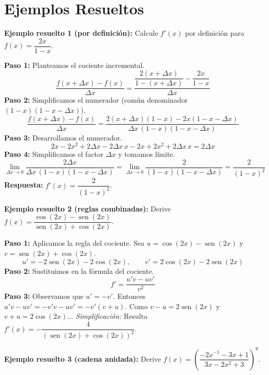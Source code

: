 \documentclass[12pt, letterpaper]{article}
\begin{document}
\newpage
\section{Ejemplos Resueltos}

\noindent\textbf{Ejemplo resuelto 1 (por definición):} Calcule $f'(x)$ por definición para $f(x) = \dfrac{2x}{1-x}$.

\begin{cuadrosolucion}
  \textbf{Paso 1:} Planteamos el cociente incremental.
  \[
    \frac{f(x+\Delta x) - f(x)}{\Delta x}
    = \frac{\dfrac{2(x+\Delta x)}{1-(x+\Delta x)} - \dfrac{2x}{1-x}}{\Delta x}
  \]
  \textbf{Paso 2:} Simplificamos el numerador (común denominador $(1-x)(1-x-\Delta x)$).
  \[
    \frac{f(x+\Delta x) - f(x)}{\Delta x}
    = \frac{2(x+\Delta x)(1-x) - 2x(1-x-\Delta x)}{\Delta x\,(1-x)(1-x-\Delta x)}
  \]
  \textbf{Paso 3:} Desarrollamos el numerador.
  \[
    2x - 2x^2 + 2\Delta x - 2\Delta x\,x - 2x + 2x^2 + 2\Delta x\,x = 2\Delta x
  \]
  \textbf{Paso 4:} Simplificamos el factor $\Delta x$ y tomamos límite.
  \[
    \lim_{\Delta x\to0} \frac{2\Delta x}{\Delta x\,(1-x)(1-x-\Delta x)} = \lim_{\Delta x\to0} \frac{2}{(1-x)(1-x-\Delta x)} = \frac{2}{(1-x)^2}
  \]
  \textbf{Respuesta:} $f'(x) = \dfrac{2}{(1-x)^2}$.
\end{cuadrosolucion}

\noindent\textbf{Ejemplo resuelto 2 (reglas combinadas):} Derive $f(x) = \dfrac{\cos(2x)-\operatorname{sen}(2x)}{\operatorname{sen}(2x)+\cos(2x)}$.

\begin{cuadrosolucion}
  \textbf{Paso 1:} Aplicamos la regla del cociente. Sea $u = \cos(2x)-\operatorname{sen}(2x)$ y $v = \operatorname{sen}(2x)+\cos(2x)$.
  \[
    u' = -2\operatorname{sen}(2x) - 2\cos(2x), \qquad
    v' = 2\cos(2x) - 2\operatorname{sen}(2x)
  \]
  \textbf{Paso 2:} Sustituimos en la fórmula del cociente.
  \[
    f' = \frac{u'v - uv'}{v^2}
  \]
  \textbf{Paso 3:} Observamos que $u' = -v'$. Entonces $u'v - uv' = -v'v - uv' = -v'(v+u)$. Como $v - u = 2\operatorname{sen}(2x)$ y $v + u = 2\cos(2x)$...
  \noindent\textit{Simplificación:} Resulta $f'(x) = -\dfrac{4}{( \operatorname{sen}(2x)+\cos(2x) )^2}$.
\end{cuadrosolucion}

\noindent\textbf{Ejemplo resuelto 3 (cadena anidada):} Derive $f(x) = \left(\dfrac{-2x^{-1} - 3x + 1}{3x - 2x^2 + 3}\right)^{8}$.
\end{document}
